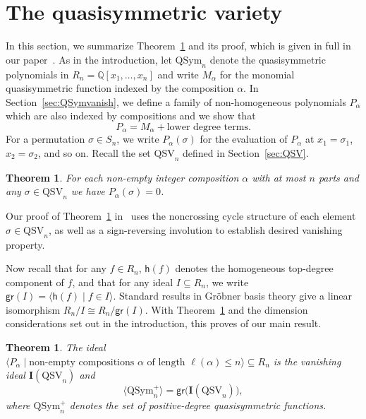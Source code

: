 \documentclass[submission]{FPSAC2024}
\newtheorem{thm}[equation]{Theorem}
\theoremstyle{definition}
\theoremstyle{remark}
\numberwithin{equation}{section}
\newcommand{\QQ}{\mathbb{Q}}
\newcommand{\QSym}{\mathrm{QSym}}
\newcommand{\QSV}{\mathrm{QSV}}
\begin{document}
\section{The quasisymmetric variety}
\label{sec:vanishingtheorems}

In this section, we summarize Theorem~\ref{thm:vanishingQSV} and its proof, which is given in full in our paper~\cite{BG}.  
As in the introduction, let $\QSym_{n}$ denote the quasisymmetric polynomials in $R_{n} = \QQ[x_{1}, \ldots, x_{n}]$ and write $M_{\alpha}$ for the monomial quasisymmetric function indexed by the composition $\alpha$.  In Section~\ref{sec:QSymvanish}, we define a family of non-homogeneous polynomials $P_{\alpha}$ which are also indexed by compositions and we show that
\begin{equation}
\label{eq:Palphahomogeneous}
P_{\alpha} = M_{\alpha} + \text{lower degree terms}.
\end{equation}
For a permutation $\sigma \in S_{n}$, we write $P_{\alpha}(\sigma)$ for the evaluation of $P_{\alpha}$ at $x_{1} = \sigma_{1}$, $x_{2} = \sigma_{2}$, and so on.  Recall the set $\QSV_{n}$ defined in Section~\ref{sec:QSV}.

\begin{thm}
\label{thm:vanishing}
For each non-empty integer composition $\alpha$ with at most $n$ parts and any $\sigma\in \QSV_n$ we have $P_{\alpha} (\sigma)=0$.
\end{thm}

Our proof of Theorem~\ref{thm:vanishing} in~\cite{BG} uses the noncrossing cycle structure of each element $\sigma\in \QSV_n$, as well as a sign-reversing involution to establish desired vanishing property.


Now recall that for any $f \in R_{n}$, $\mathsf{h}(f)$ denotes the homogeneous top-degree component of $f$, and that for any ideal $I \subseteq R_{n}$, we write
$
\mathsf{gr}(I) = \langle \mathsf{h}(f) \;|\; f \in I \rangle.
$
Standard results in Gr\"{o}bner basis theory give a linear isomorphism $R_{n}\big/I \cong R_{n} \big/ \mathsf{gr}(I)$.  With Theorem~\ref{thm:vanishing} and the dimension considerations set out in the introduction, this proves of our main result.  

\begin{thm}\label{thm:vanishingQSV} 
The ideal $\langle P_{\alpha} \;|\; \text{non-empty compositions $\alpha$ of length $\ell(\alpha) \le n$} \rangle \subseteq R_n$ is the vanishing ideal $\mathbf{I}(\QSV_n)$ and 
\[
\langle \QSym_{n}^{+} \rangle = \mathsf{gr}\big(\mathbf{I}(\QSV_{n})\big),
\]
where  $\QSym_{n}^{+}$ denotes the set of positive-degree quasisymmetric functions.
 \end{thm}
 
\end{document}
